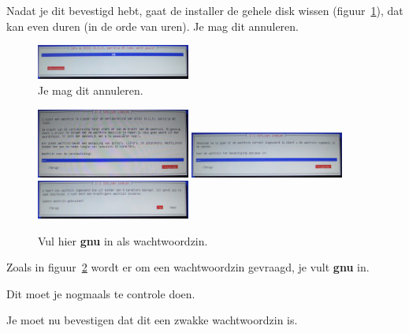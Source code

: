 \documentclass[12pt,a4paper]{article}
\begin{document}
Nadat je dit bevestigd hebt, gaat de installer de gehele disk wissen (figuur~\ref{fig:schijf-wissen}), dat kan even duren (in de orde van uren). Je mag dit annuleren.

\begin{figure}[H]
\centering
\includegraphics[width=0.45\textwidth]{schijven-wissen-scherm}
\caption{Je mag dit annuleren.}
\label{fig:schijf-wissen}
\end{figure}

\begin{figure}[H]
\centering
\includegraphics[width=0.45\textwidth]{schijven-wachtwoordzin-scherm}
\includegraphics[width=0.45\textwidth]{schijven-wachtwoordzin-bevestiging}
\includegraphics[width=0.45\textwidth]{schijven-zwakke-wachtwoordzin}
\caption{Vul hier \textbf{gnu} in als wachtwoordzin.}
\label{fig:wachtwoordzin-scherm}
\end{figure}

Zoals in figuur~\ref{fig:wachtwoordzin-scherm} wordt er om een wachtwoordzin gevraagd, je vult \textbf{gnu} in.

Dit moet je nogmaals te controle doen.

Je moet nu bevestigen dat dit een zwakke wachtwoordzin is. 
\end{document}
